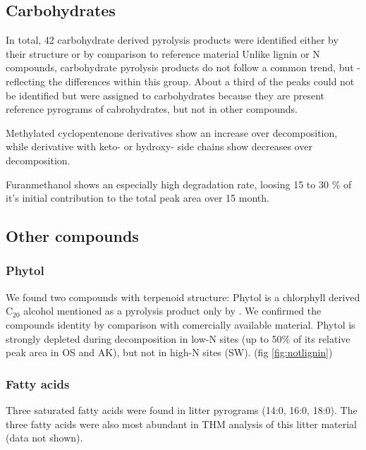 \documentclass[preprint,review,12pt]{elsarticle}
\begin{document}
\subsection{Carbohydrates}
In total, 42 carbohydrate derived pyrolysis products were identified either by their structure or by comparison to reference material %
Unlike lignin or N compounds, carbohydrate pyrolysis products do not follow a common trend, but - reflecting the differences within this group. About a third of the peaks could not be identified but were assigned to carbohydrates because they are present reference pyrograms of cabrohydrates, but not in other compounds.

Methylated cyclopentenone derivatives show an increase over decomposition, while derivative with keto- or hydroxy- side chains show decreases over decomposition.

Furanmethanol shows an especially high degradation rate, loosing 15 to 30 \% of it's initial contribution to the total peak area over 15 month.


\subsection{Other compounds}
\subsubsection{Phytol}
 
We found two compounds with terpenoid structure: Phytol is a chlorphyll derived C$_{20}$ alcohol  mentioned as a pyrolysis product only by \cite{Schwarzinger??}. We confirmed the compounds identity by comparison with comercially available material. Phytol is strongly depleted during decomposition in low-N sites (up to 50\% of its relative peak area in OS and AK), but not in high-N sites (SW). (fig \ref{fig:notlignin})




\subsubsection{Fatty acids}
Three saturated fatty acids were found in litter pyrograms (14:0, 16:0, 18:0). The three fatty acids were also most abundant in THM analysis of this litter material (data not shown).

\end{document}
